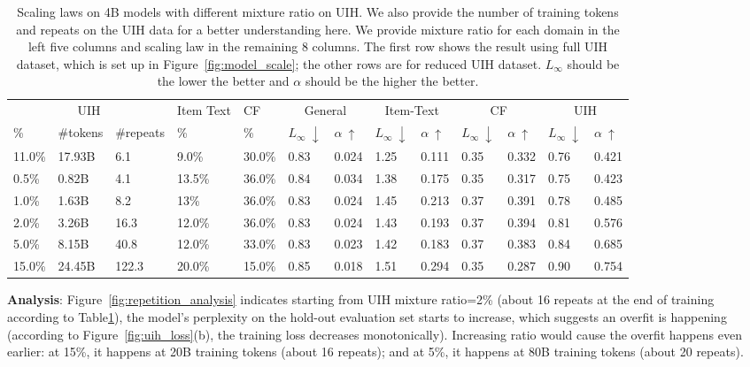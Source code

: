 \documentclass[]{fairmeta}
\begin{document}
\begin{table}[h]
\caption{Scaling laws on 4B models with different mixture ratio on UIH. We also provide the number of training tokens and repeats on the UIH data for a better understanding here. We provide mixture ratio for each domain in the left five columns and scaling law in the remaining 8 columns. The first row shows the result using full UIH dataset, which is set up in Figure~\ref{fig:model_scale}; the other rows are for reduced UIH dataset. $L_\infty$ should be the lower the better and $\alpha$ should be the higher the better.}
\label{tab:repetition_analysis}
\centering
\scriptsize
\begin{tabular}{lllll|llllllll}
\toprule
\multicolumn{3}{c|}{UIH}      & Item Text & CF & \multicolumn{2}{c}{General}                      & \multicolumn{2}{c}{Item-Text}   & \multicolumn{2}{c}{CF}     & \multicolumn{2}{c}{UIH}    \\
\%    & \#tokens & \#repeats & \%        & \% & $L_\infty\ \downarrow$ & $\alpha\ \uparrow$ & $L_\infty\ \downarrow$ & $\alpha\ \uparrow$ & $L_\infty\ \downarrow$ & $\alpha\ \uparrow$ & $L_\infty\ \downarrow$ & $\alpha\ \uparrow$ \\
\midrule
\rowcolor{lightgray}
11.0\% & 17.93B & 6.1   & 9.0\% & 30.0\% & 0.83 & 0.024 & 1.25 & 0.111 & 0.35 & 0.332 & 0.76 & 0.421 \\
0.5\%  & 0.82B  & 4.1   & 13.5\% & 36.0\% & 0.84 & 0.034 & 1.38 & 0.175 & 0.35 & 0.317 & 0.75 & 0.423 \\
1.0\%  & 1.63B  & 8.2   & 13\% & 36.0\% & 0.83 & 0.024 & 1.45 & 0.213 & 0.37 & 0.391 & 0.78 & 0.485 \\
2.0\%  & 3.26B  & 16.3  & 12.0\% & 36.0\% & 0.83 & 0.024 & 1.43 & 0.193 & 0.37 & 0.394 & 0.81 & 0.576 \\
5.0\%  & 8.15B  & 40.8  & 12.0\% & 33.0\% & 0.83 & 0.023 & 1.42 & 0.183 & 0.37 & 0.383 & 0.84 & 0.685 \\
15.0\% & 24.45B & 122.3 & 20.0\% & 15.0\% & 0.85 & 0.018 & 1.51 & 0.294 & 0.35 & 0.287 & 0.90 & 0.754\\
\bottomrule
\end{tabular}
\end{table}

\textbf{Analysis}: Figure~\ref{fig:repetition_analysis} indicates starting from UIH mixture ratio=2\% (about 16 repeats at the end of training according to Table\ref{tab:repetition_analysis}), the model's perplexity on the hold-out evaluation set starts to increase, which suggests an overfit is happening (according to Figure~\ref{fig:uih_loss}(b), the training loss decreases monotonically). Increasing ratio would cause the overfit happens even earlier: at 15\%, it happens at 20B training tokens (about 16 repeats); and at 5\%, it happens at 80B training tokens (about 20 repeats).
\end{document}

